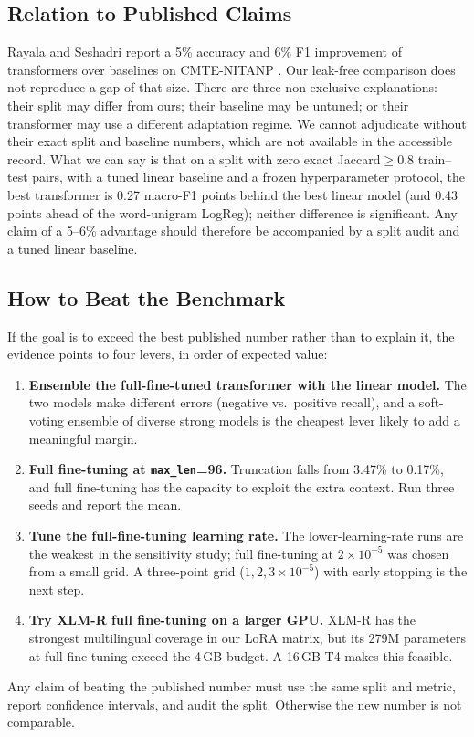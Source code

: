 \documentclass[10pt,journal]{IEEEtran}
\begin{document}
\subsection{Relation to Published Claims}
Rayala and Seshadri report a 5\% accuracy and 6\% F1 improvement of transformers over baselines on CMTE-NITANP \cite{rayala2026}. Our leak-free comparison does not reproduce a gap of that size. There are three non-exclusive explanations: their split may differ from ours; their baseline may be untuned; or their transformer may use a different adaptation regime. We cannot adjudicate without their exact split and baseline numbers, which are not available in the accessible record. What we can say is that on a split with zero exact Jaccard$\geq0.8$ train--test pairs, with a tuned linear baseline and a frozen hyperparameter protocol, the best transformer is 0.27 macro-F1 points behind the best linear model (and 0.43 points ahead of the word-unigram LogReg); neither difference is significant. Any claim of a 5--6\% advantage should therefore be accompanied by a split audit and a tuned linear baseline.

\subsection{How to Beat the Benchmark}
If the goal is to exceed the best published number rather than to explain it, the evidence points to four levers, in order of expected value:
\begin{enumerate}
\item \textbf{Ensemble the full-fine-tuned transformer with the linear model.} The two models make different errors (negative vs.\ positive recall), and a soft-voting ensemble of diverse strong models is the cheapest lever likely to add a meaningful margin.
\item \textbf{Full fine-tuning at \texttt{max\_len}=96.} Truncation falls from 3.47\% to 0.17\%, and full fine-tuning has the capacity to exploit the extra context. Run three seeds and report the mean.
\item \textbf{Tune the full-fine-tuning learning rate.} The lower-learning-rate runs are the weakest in the sensitivity study; full fine-tuning at $2\times10^{-5}$ was chosen from a small grid. A three-point grid ($1,2,3\times10^{-5}$) with early stopping is the next step.
\item \textbf{Try XLM-R full fine-tuning on a larger GPU.} XLM-R has the strongest multilingual coverage in our LoRA matrix, but its 279M parameters at full fine-tuning exceed the 4\,GB budget. A 16\,GB T4 makes this feasible.
\end{enumerate}
Any claim of beating the published number must use the same split and metric, report confidence intervals, and audit the split. Otherwise the new number is not comparable.
\end{document}
